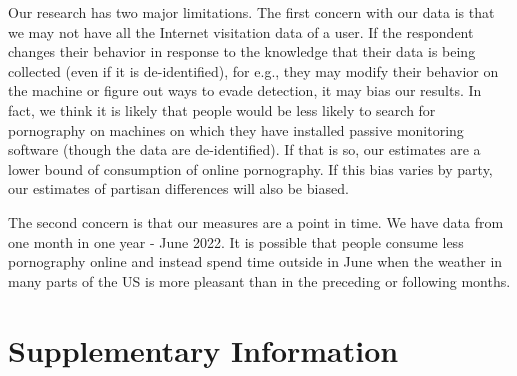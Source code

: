 \documentclass[12pt,twoside]{article}
\begin{document}
Our research has two major limitations. The first concern with our data is that we may not have all the Internet visitation data of a user. If the respondent changes their behavior in response to the knowledge that their data is being collected (even if it is de-identified), for e.g., they may modify their behavior on the machine or figure out ways to evade detection, it may bias our results. In fact, we think it is likely that people would be less likely to search for pornography on machines on which they have installed passive monitoring software (though the data are de-identified). If that is so, our estimates are a lower bound of consumption of online pornography. If this bias varies by party, our estimates of partisan differences will also be biased. 

The second concern is that our measures are a point in time. We have data from one month in one year - June 2022. It is possible that people consume less pornography online and instead spend time outside in June when the weather in many parts of the US is more pleasant than in the preceding or following months. 







\clearpage
\setcounter{table}{0}
\setcounter{figure}{0}
\setcounter{equation}{0}

\setcounter{secnumdepth}{0}
\section[Supplementary Information]{\large Supplementary Information}\label{sec:sm}
\normalsize

\newcommand{\smATitle}{Descriptive Analyses}
\newcommand{\smBTitle}{Partisan Differences}
\newcommand{\smCTitle}{Online Pornography vs. Leisure}
\newcommand{\smDTitle}{Time of Consumption}
\newcommand{\smETitle}{Alternate Classifications of Pornography Sites}
\newcommand{\smFTitle}{Consumption of Pornography Among Independents}
\newcommand{\smGTitle}{Alternate Measures of Pornography}
\newcommand{\smHTitle}{Missing at Random}
\end{document}
